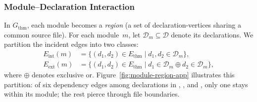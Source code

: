 \subsubsection{Module--Declaration Interaction}
\label{sec:cohesion}

In $G_{\mathrm{thm}}$, each module becomes a \emph{region} (a set of declaration-vertices sharing a common source file). For each module~$m$, let $\mathcal{D}_m \subseteq \mathcal{D}$ denote its declarations. We partition the incident edges into two classes:
\begin{align*}
  E_{\mathrm{int}}(m) &= \{(d_1, d_2) \in E_{\mathrm{thm}} \mid d_1, d_2 \in \mathcal{D}_m\}, \\
  E_{\mathrm{ext}}(m) &= \{(d_1, d_2) \in E_{\mathrm{thm}} \mid d_1 \in \mathcal{D}_m \oplus d_2 \in \mathcal{D}_m\},
\end{align*}
where $\oplus$ denotes exclusive or. Figure~\ref{fig:module-region-app} illustrates this partition: of six dependency edges among declarations in , , and , only one stays within its module; the rest pierce through file boundaries.

